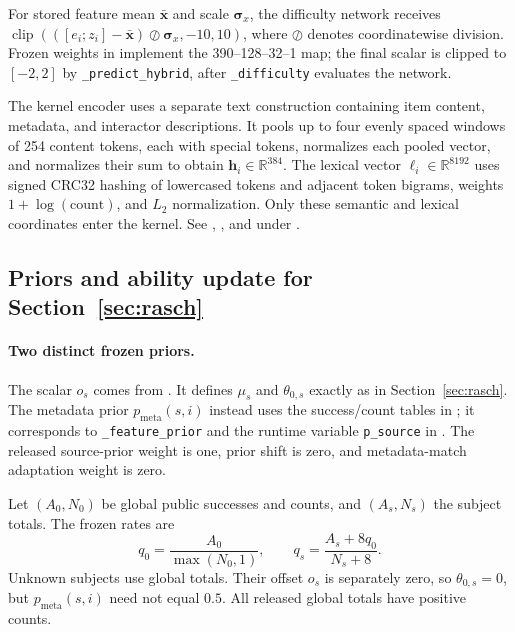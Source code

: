 \documentclass{article}
\begin{document}
For stored feature mean $\bar{\mathbf x}$ and scale $\boldsymbol\sigma_x$, the difficulty network receives $\operatorname{clip}(([e_i;z_i]-\bar{\mathbf x})\oslash\boldsymbol\sigma_x,-10,10)$, where $\oslash$ denotes coordinatewise division. Frozen weights in  implement the 390--128--32--1 map; the final scalar is clipped to $[-2,2]$ by \texttt{\_predict\_hybrid}, after \texttt{\_difficulty} evaluates the network.

The kernel encoder uses a separate text construction containing item content, metadata, and interactor descriptions. It pools up to four evenly spaced windows of 254 content tokens, each with special tokens, normalizes each pooled vector, and normalizes their sum to obtain $\mathbf h_i\in\mathbb R^{384}$. The lexical vector $\boldsymbol\ell_i\in\mathbb R^{8192}$ uses signed CRC32 hashing of lowercased tokens and adjacent token bigrams, weights $1+\log(\text{count})$, and $L_2$ normalization. Only these semantic and lexical coordinates enter the kernel. See , , and  under .

\subsection{Priors and ability update for Section~\ref{sec:rasch}}\label{app:priors}

\paragraph{Two distinct frozen priors.}
The scalar $o_s$ comes from . It defines $\mu_s$ and $\theta_{0,s}$ exactly as in Section~\ref{sec:rasch}. The metadata prior $p_{\mathrm{meta}}(s,i)$ instead uses the success/count tables in ; it corresponds to \texttt{\_feature\_prior} and the runtime variable \texttt{p\_source} in . The released source-prior weight is one, prior shift is zero, and metadata-match adaptation weight is zero.

Let $(A_0,N_0)$ be global public successes and counts, and $(A_s,N_s)$ the subject totals. The frozen rates are
\[
 q_0=\frac{A_0}{\max(N_0,1)},\qquad q_s=\frac{A_s+8q_0}{N_s+8}.
\]
Unknown subjects use global totals. Their offset $o_s$ is separately zero, so $\theta_{0,s}=0$, but $p_{\mathrm{meta}}(s,i)$ need not equal $0.5$. All released global totals have positive counts.
\end{document}
